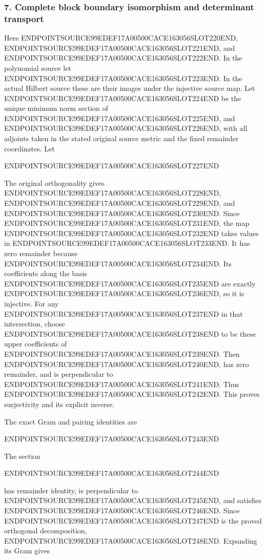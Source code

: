 \subsubsection{7. Complete block boundary isomorphism and determinant transport}\label{endpoint-arithmetic_intake--complete-block-boundary-isomorphism-and-determinant-transport}

Here ENDPOINTSOURCE99EDEF17A00500CACE163056SLOT220END, ENDPOINTSOURCE99EDEF17A00500CACE163056SLOT221END, and ENDPOINTSOURCE99EDEF17A00500CACE163056SLOT222END. In the polynomial source let ENDPOINTSOURCE99EDEF17A00500CACE163056SLOT223END. In the actual Hilbert source these are their images under the injective source map. Let ENDPOINTSOURCE99EDEF17A00500CACE163056SLOT224END be the unique minimum norm section of ENDPOINTSOURCE99EDEF17A00500CACE163056SLOT225END, and ENDPOINTSOURCE99EDEF17A00500CACE163056SLOT226END, with all adjoints taken in the stated original source metric and the fixed remainder coordinates. Let

ENDPOINTSOURCE99EDEF17A00500CACE163056SLOT227END

The original orthogonality gives ENDPOINTSOURCE99EDEF17A00500CACE163056SLOT228END, ENDPOINTSOURCE99EDEF17A00500CACE163056SLOT229END, and ENDPOINTSOURCE99EDEF17A00500CACE163056SLOT230END. Since ENDPOINTSOURCE99EDEF17A00500CACE163056SLOT231END, the map ENDPOINTSOURCE99EDEF17A00500CACE163056SLOT232END takes values in ENDPOINTSOURCE99EDEF17A00500CACE163056SLOT233END. It has zero remainder because ENDPOINTSOURCE99EDEF17A00500CACE163056SLOT234END. Its coefficients along the basis ENDPOINTSOURCE99EDEF17A00500CACE163056SLOT235END are exactly ENDPOINTSOURCE99EDEF17A00500CACE163056SLOT236END, so it is injective. For any ENDPOINTSOURCE99EDEF17A00500CACE163056SLOT237END in that intersection, choose ENDPOINTSOURCE99EDEF17A00500CACE163056SLOT238END to be these upper coefficients of ENDPOINTSOURCE99EDEF17A00500CACE163056SLOT239END. Then ENDPOINTSOURCE99EDEF17A00500CACE163056SLOT240END, has zero remainder, and is perpendicular to ENDPOINTSOURCE99EDEF17A00500CACE163056SLOT241END. Thus ENDPOINTSOURCE99EDEF17A00500CACE163056SLOT242END. This proves surjectivity and its explicit inverse.

The exact Gram and pairing identities are

ENDPOINTSOURCE99EDEF17A00500CACE163056SLOT243END

The section

ENDPOINTSOURCE99EDEF17A00500CACE163056SLOT244END

has remainder identity, is perpendicular to ENDPOINTSOURCE99EDEF17A00500CACE163056SLOT245END, and satisfies ENDPOINTSOURCE99EDEF17A00500CACE163056SLOT246END. Since ENDPOINTSOURCE99EDEF17A00500CACE163056SLOT247END is the proved orthogonal decomposition, ENDPOINTSOURCE99EDEF17A00500CACE163056SLOT248END. Expanding its Gram gives

